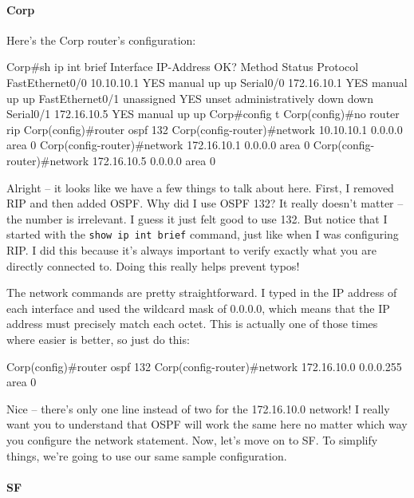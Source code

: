 \paragraph{Corp}

Here's the Corp router's configuration:

\begin{cli}
Corp#sh ip int brief
Interface        IP-Address      OK? Method Status                Protocol
FastEthernet0/0  10.10.10.1      YES manual up                    up
Serial0/0        172.16.10.1     YES manual up                    up
FastEthernet0/1  unassigned      YES unset  administratively down down
Serial0/1        172.16.10.5     YES manual up                    up
Corp#config t
Corp(config)#no router rip
Corp(config)#router ospf 132
Corp(config-router)#network 10.10.10.1 0.0.0.0 area 0
Corp(config-router)#network 172.16.10.1 0.0.0.0 area 0
Corp(config-router)#network 172.16.10.5 0.0.0.0 area 0
\end{cli}

Alright -- it looks like we have a few things to talk about here. First,
I removed RIP and then added OSPF. Why did I use OSPF 132? It really
doesn't matter -- the number is irrelevant. I guess it just felt good to
use 132. But notice that I started with the
\texttt{show\ ip\ int\ brief} command, just like when I was configuring
RIP. I did this because it's always
\protect\hypertarget{c18.xhtmlux5cux23Page_759}{}{}important to verify
exactly what you are directly connected to. Doing this really helps
prevent typos!

The network commands are pretty straightforward. I typed in the IP
address of each interface and used the wildcard mask of 0.0.0.0, which
means that the IP address must precisely match each octet. This is
actually one of those times where easier is better, so just do this:

\begin{cli}
Corp(config)#router ospf 132
Corp(config-router)#network 172.16.10.0 0.0.0.255 area 0
\end{cli}

Nice -- there's only one line instead of two for the 172.16.10.0 network!
I really want you to understand that OSPF will work the same here no
matter which way you configure the network statement. Now, let's move on
to SF. To simplify things, we're going to use our same sample
configuration.

\paragraph{SF}

